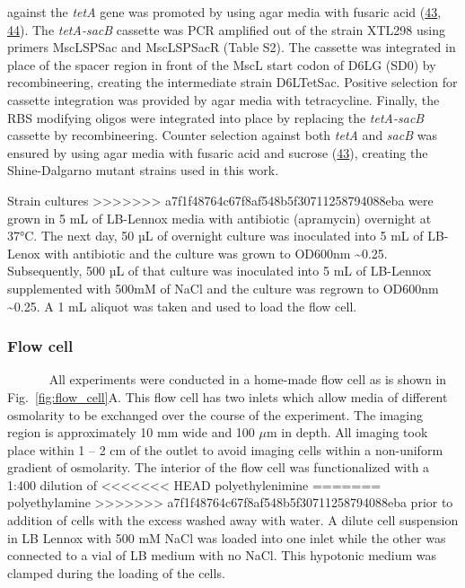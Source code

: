 against
the
\emph{tetA}
gene
was
promoted
by
using
agar
media
with
fusaric
acid
(\protect\hyperlink{ref-li2013}{43},
\protect\hyperlink{ref-bochner1980}{44}).
The
\emph{tetA-sacB}
cassette
was
PCR
amplified
out of
the
strain
XTL298
using
primers
MscLSPSac
and
MscLSPSacR
(Table
S2).
The
cassette
was
integrated
in
place
of the
spacer
region
in
front
of the
MscL
start
codon
of
D6LG
(SD0)
by
recombineering,
creating
the
intermediate
strain
D6LTetSac.
Positive
selection
for
cassette
integration
was
provided
by
agar
media
with
tetracycline.
Finally,
the
RBS
modifying
oligos
were
integrated
into
place
by
replacing
the
\emph{tetA-sacB}
cassette
by
recombineering.
Counter
selection
against
both
\emph{tetA}
and
\emph{sacB}
was
ensured
by
using
agar
media
with
fusaric
acid
and
sucrose
(\protect\hyperlink{ref-li2013}{43}),
creating
the
Shine-Dalgarno
mutant
strains
used
in
this
work.

Strain
cultures
>>>>>>> a7f1f48764c67f8af548b5f30711258794088eba
were
grown
in 5
mL of
LB-Lennox
media
with
antibiotic
(apramycin)
overnight
at
37°C.
The
next
day,
50 µL
of
overnight
culture
was
inoculated
into 5
mL of
LB-Lenox
with
antibiotic
and
the
culture
was
grown
to
OD600nm
\textasciitilde{}0.25.
Subsequently,
500 µL
of
that
culture
was
inoculated
into 5
mL of
LB-Lennox
supplemented
with
500mM
of
NaCl
and
the
culture
was
regrown
to
OD600nm
\textasciitilde{}0.25.
A 1 mL
aliquot
was
taken
and
used
to
load
the
flow
cell.

\subsubsection{Flow
cell}\label{flow-cell}

~ ~ ~
~ All
experiments
were
conducted
in a
home-made
flow
cell
as is
shown
in
Fig.~\ref{fig:flow_cell}A.
This
flow
cell
has
two
inlets
which
allow
media
of
different
osmolarity
to be
exchanged
over
the
course
of the
experiment.
The
imaging
region
is
approximately
10 mm
wide
and
100
\(\mu\)m
in
depth.
All
imaging
took
place
within
1 -- 2
cm of
the
outlet
to
avoid
imaging
cells
within
a
non-uniform
gradient
of
osmolarity.
The
interior
of the
flow
cell
was
functionalized
with a
1:400
dilution
of
<<<<<<< HEAD
polyethylenimine
=======
polyethylamine
>>>>>>> a7f1f48764c67f8af548b5f30711258794088eba
prior
to
addition
of
cells
with
the
excess
washed
away
with
water.
A
dilute
cell
suspension
in LB
Lennox
with
500 mM
NaCl
was
loaded
into
one
inlet
while
the
other
was
connected
to a
vial
of LB
medium
with
no
NaCl.
This
hypotonic
medium
was
clamped
during
the
loading
of the
cells.

